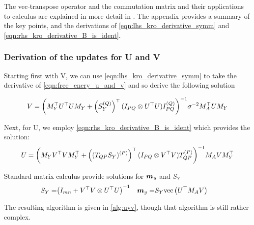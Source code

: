 The vec-transpose operator and the commutation matrix and their applications to calculus are explained in more detail in \cite{Minka2000a}. The appendix provides a summary of the key points, and the derivations of \eqref{eqn:lhs_kro_derivative_symm} and \eqref{eqn:rhs_kro_derivative_B_is_ident}.

\subsubsection*{Derivation of the updates for U and V}

Starting first with V, we can use \eqref{eqn:lhs_kro_derivative_symm} to take the derivative of \eqref{eqn:free_enery_u_and_v} and so derive the following solution

\begin{equation}
V = {\left( M_Y^\top U^\top U M_Y + \left({ S_Y^{(Q)} }\right)^\top (I_{PQ} \otimes U^\top U) { I_{PQ}^{(Q)} }  \right)}^{-1} \sigma^{-2} M_A ^\top U M_Y
\end{equation}

Next, for U, we employ \eqref{eqn:rhs_kro_derivative_B_is_ident} which provides the solution:
\begin{equation}
U = {\left( M_Y V^\top V M_Y^\top + \left( { (T_{QP} S_Y)^{(P)} } \right)^\top (I_{PQ} \otimes V^\top V){ T_{QP}^{(P)} } \right)}^{-1} M_A V M_Y^\top
\end{equation}

Standard matrix calculus provide solutions for $\bm m_y $ and $S_Y$
\begin{align}
S_Y = & {\left( I_{mn} + V^\top V \otimes U^\top U \right)}^{-1}
& \bm m_y = & S_Y \text{vec}\left(U^\top M_A V\right)
\end{align}

The resulting algorithm is given in \ref{alg:uyv}, though that algorithm is still rather complex.

